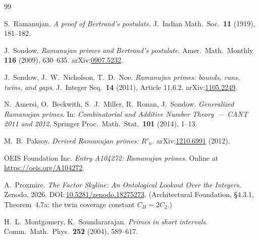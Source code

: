 \documentclass[11pt]{article}
\begin{document}
\begin{thebibliography}{99}

S.~Ramanujan.
\emph{A proof of Bertrand's postulate}.
J.~Indian Math.\ Soc.\ \textbf{11} (1919), 181--182.

J.~Sondow.
\emph{Ramanujan primes and Bertrand's postulate}.
Amer.\ Math.\ Monthly \textbf{116} (2009), 630--635.
arXiv:\href{https://arxiv.org/abs/0907.5232}{0907.5232}.

J.~Sondow, J.~W.~Nicholson, T.~D.~Noe.
\emph{Ramanujan primes: bounds, runs, twins, and gaps}.
J.~Integer Seq.\ \textbf{14} (2011), Article 11.6.2.
arXiv:\href{https://arxiv.org/abs/1105.2249}{1105.2249}.

N.~Amersi, O.~Beckwith, S.~J.~Miller, R.~Ronan, J.~Sondow.
\emph{Generalized Ramanujan primes}.
In: \emph{Combinatorial and Additive Number Theory~--- CANT 2011 and 2012},
Springer Proc.\ Math.\ Stat.\ \textbf{101} (2014), 1--13.

M.~B.~Paksoy.
\emph{Derived Ramanujan primes: $R'_n$}.
arXiv:\href{https://arxiv.org/abs/1210.6991}{1210.6991} (2012).

OEIS Foundation Inc.
\emph{Entry A104272: Ramanujan primes}.
Online at \url{https://oeis.org/A104272}.

A.~Proxmire.
\emph{The Factor Skyline: An Ontological Lookout Over the Integers}.
Zenodo, 2026.
DOI:\,\href{https://doi.org/10.5281/zenodo.18275273}{10.5281/zenodo.18275273}.
(Architectural Foundation, \S4.3.1, Theorem~4.7a: the twin coverage constant
$C_H=2C_2$.)

H.~L.~Montgomery, K.~Soundararajan.
\emph{Primes in short intervals}.
Comm.\ Math.\ Phys.\ \textbf{252} (2004), 589--617.

\end{thebibliography}
\end{document}
